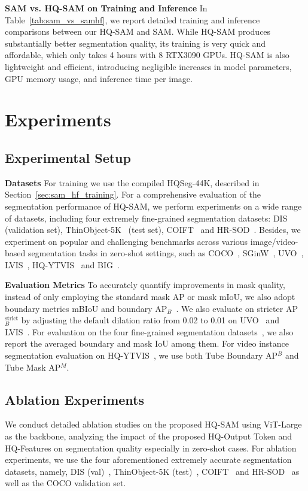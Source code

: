 \textbf{SAM vs. HQ-SAM on Training and Inference}  In Table~\ref{tab:sam_vs_samhf}, we report  detailed training and inference comparisons between our HQ-SAM and SAM. While HQ-SAM produces substantially better segmentation quality, its training is very quick and affordable, which only takes 4 hours with 8 RTX3090 GPUs. HQ-SAM is also lightweight and efficient, introducing negligible increases in model parameters, GPU memory usage, and inference time per image.

\section{Experiments}

\subsection{Experimental Setup}

\textbf{Datasets}  For training we use the compiled HQSeg-44K, described in Section~\ref{sec:sam_hf_training}. For a comprehensive evaluation of the segmentation performance of HQ-SAM, we perform experiments on a wide range of datasets, including four extremely fine-grained segmentation datasets: DIS~\cite{qin2022} (validation set), ThinObject-5K~\cite{liew2021deep} (test set), COIFT~\cite{liew2021deep} and HR-SOD~\cite{zeng2019towards}. Besides, we experiment on popular and challenging benchmarks across various image/video-based segmentation tasks in zero-shot settings, such as COCO~\cite{lin2014microsoft}, SGinW~\cite{zou2023generalized}, UVO~\cite{uvo}, LVIS~\cite{gupta2019lvis}, HQ-YTVIS~\cite{vmt} and BIG~\cite{cascadepsp}.

\textbf{Evaluation Metrics} To accurately quantify improvements in mask quality, instead of only employing the standard mask AP or mask mIoU, we also adopt boundary metrics mBIoU and boundary AP$_B$~\cite{cheng2021boundary}. We also evaluate on stricter AP$_B^\text{strict}$ by adjusting the default dilation ratio from 0.02 to 0.01 on UVO~\cite{uvo} and LVIS~\cite{gupta2019lvis}. For evaluation on the four fine-grained segmentation datasets~\cite{qin2022,liew2021deep,zeng2019towards}, we also report the averaged boundary and mask IoU among them. For video instance segmentation evaluation on HQ-YTVIS~\cite{vmt}, we use both Tube Boundary AP$^{B}$ and Tube Mask AP$^{M}$.

\subsection{Ablation Experiments} We conduct detailed ablation studies on the proposed HQ-SAM using ViT-Large as the backbone, analyzing the impact of the proposed HQ-Output Token and HQ-Features on segmentation quality especially in zero-shot cases. For ablation experiments, we use the four aforementioned extremely accurate segmentation datasets, namely, DIS (val)~\cite{qin2022}, ThinObject-5K (test)~\cite{liew2021deep}, COIFT~\cite{liew2021deep} and HR-SOD~\cite{zeng2019towards} as well as the COCO validation set.

